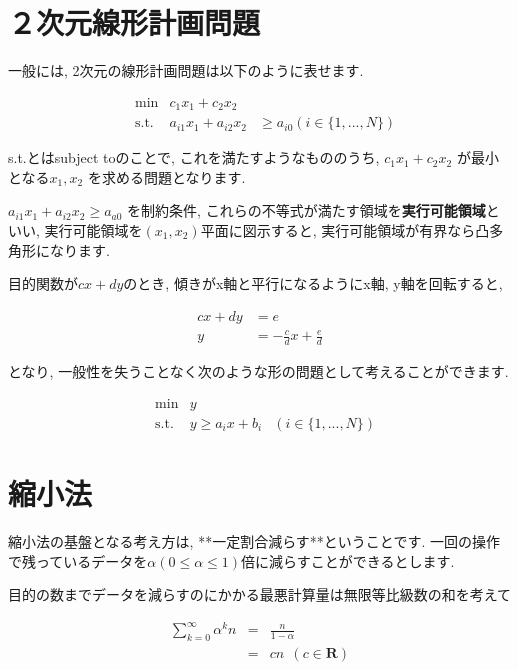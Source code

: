\documentclass[dvipdfmx,12pt]{jsarticle}%
\begin{document}
\section{２次元線形計画問題}
一般には, 2次元の線形計画問題は以下のように表せます.


\begin{equation*}
  \begin{aligned}
      & \text{min}
          & c_1x_1 + c_2x_2& \\
      & \text{s.t.}
          & a_{i1}x_1 + a_{i2}x_2 &\geq a_{i0} (i\in\{1,...,N\})
  \end{aligned}
\end{equation*}

s.t.とはsubject toのことで, これを満たすようなもののうち, ${c_1x_1 + c_2x_2}$ が最小となる$x_1,x_2$ を求める問題となります.

$a_{i1}x_1 + a_{i2}x_2 \geq a_{a0}$ を制約条件, これらの不等式が満たす領域を{\bf 実行可能領域}といい,
実行可能領域を$(x_1,x_2)$平面に図示すると, 実行可能領域が有界なら凸多角形になります.

目的関数が$cx+dy$のとき, 傾きがx軸と平行になるようにx軸, y軸を回転すると, 


\begin{align*}
  cx+dy&=e \\
  y&= -\frac{c}{d}x+\frac{e}{d}
\end{align*}

となり, 一般性を失うことなく次のような形の問題として考えることができます.

\begin{equation*}
  \begin{aligned}
      & \text{min}
          & y& \\
      & \text{s.t.}
          & y \geq a_ix + b_i 
          &(i \in \{1,...,N\})
  \end{aligned}
\end{equation*}



\section{縮小法}
縮小法の基盤となる考え方は, **一定割合減らす**ということです.
一回の操作で残っているデータを$\alpha (0\leq \alpha \leq 1)$倍に減らすことができるとします.

目的の数までデータを減らすのにかかる最悪計算量は無限等比級数の和を考えて


\begin{eqnarray*}
  \sum_{k=0}^{\infty} α^kn&=&\frac{n}{1-α}\\
    &=&cn ~~ (c\in \boldsymbol{R})
\end{eqnarray*}
\end{document}
